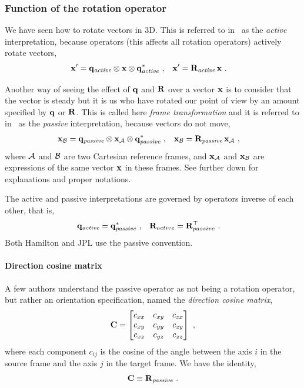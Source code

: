 \subsubsection{Function of the rotation operator}

We have seen how to rotate vectors in 3D. This is referred to in~\citep{SHUSTER-93} as the \emph{active} interpretation, 
because operators (this affects all rotation operators) actively rotate vectors,
%
\begin{align}
{\bf x}' &={\bf q}_{\textit{active}}\otimes{\bf x}\otimes{\bf q}_{\textit{active}}^* ~,
& 
{\bf x}' &= {\bf R}_{\textit{active}}\,{\bf x}~.
\end{align}

Another way of seeing the effect of ${\bf q}$ and ${\bf R}$ over a vector ${\bf x}$ is to consider that the vector is steady but it is us who have rotated our point of view by an amount specified by ${\bf q}$ or ${\bf R}$. 
This is called here \emph{frame transformation} and it is referred to in~\citep{SHUSTER-93} as the \emph{passive} interpretation, because vectors do not move,
%
\begin{align}
{\bf x}_{\mathcal{B}} &= {\bf q}_{\textit{passive}}\otimes{\bf x}_{\mathcal{A}}\otimes{\bf q}_{\textit{passive}}^*~,
&
{\bf x}_{\mathcal{B}}&={\bf R}_{\textit{passive}}\,{\bf x}_{\mathcal{A}}~,
\end{align}
%
where $\mathcal{A}$ and $\mathcal{B}$ are two Cartesian reference frames, and ${\bf x}_{\mathcal{A}}$ and ${\bf x}_{\mathcal{B}}$ are expressions of the same vector ${\bf x}$ in these frames. 
See further down for explanations and proper notations.


The active and passive interpretations are governed by operators inverse of each other, that is, 
%
\begin{align*}
{\bf q}_{\textit{active}} &= {\bf q}_{\textit{passive}}^* ~,
& 
{\bf R}_{active} &= {\bf R}_{passive}^{\top} ~.
\end{align*}
%
Both Hamilton and JPL use the passive convention. 

\paragraph{Direction cosine matrix}
A few authors understand the passive operator as not being a rotation operator, 
but rather an orientation specification, named the \emph{direction cosine matrix},
%
\begin{align}
{\bf C} = \begin{bmatrix}
c_{xx} & c_{xy} & c_{zx} \\
c_{xy} & c_{yy} & c_{zy} \\
c_{xz} & c_{yz} & c_{zz} 
\end{bmatrix}
~,
\end{align}
%
where each component $c_{ij}$ is the cosine of the angle between the axis $i$ in the source frame and the axis $j$ in the target frame. We have the identity,
%
\begin{align}
{\bf C} \equiv {\bf R}_{\textit{passive}}
~.
\end{align}


